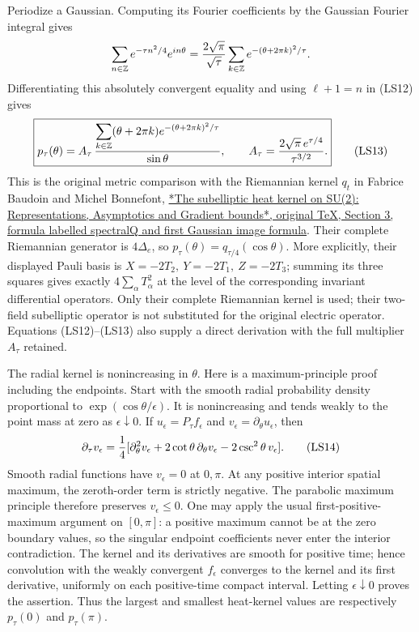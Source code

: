 \documentclass[11pt]{article}
\begin{document}
Periodize a Gaussian. Computing its Fourier coefficients by the
Gaussian Fourier integral gives
\[
 \sum_{n\in\mathbb Z}e^{-\tau n^2/4}e^{in\theta}
 ={2\sqrt\pi\over\sqrt\tau}
            \sum_{k\in\mathbb Z}e^{-(\theta+2\pi k)^2/\tau}.
 \]
Differentiating this absolutely convergent equality and using
\(\ell+1=n\) in (LS12) gives
\[
 \boxed{p_\tau(\theta)=
 A_\tau\,{\displaystyle\sum_{k\in\mathbb Z}
       (\theta+2\pi k)e^{-(\theta+2\pi k)^2/\tau}
                    \over\sin\theta},\qquad
 A_\tau={2\sqrt\pi\,e^{\tau/4}\over\tau^{3/2}}.}
 \tag{LS13}
\]
This is the original metric comparison with the Riemannian
kernel \(q_t\) in Fabrice Baudoin and Michel Bonnefont,
\href{https://arxiv.org/src/0802.3320v1}{*The subelliptic heat kernel on SU(2): Representations, Asymptotics and Gradient bounds*, original TeX, Section 3, formula labelled spectralQ and first Gaussian image formula}.
Their complete Riemannian generator is \(4\Delta_e\), so
\(p_\tau(\theta)=q_{\tau/4}(\cos\theta)\).
More explicitly, their displayed Pauli basis is
\(X=-2T_2,\ Y=-2T_1,\ Z=-2T_3\); summing its three squares
gives exactly \(4\sum_\alpha T_\alpha^2\) at the level of
the corresponding invariant differential operators.
Only their complete Riemannian kernel is used; their two-field
subelliptic operator is not substituted for the original electric
operator. Equations (LS12)–(LS13) also supply a direct derivation
with the full multiplier \(A_\tau\) retained.

The radial kernel is nonincreasing in \(\theta\). Here is a
maximum-principle proof including the endpoints. Start with the
smooth radial probability density proportional to
\(\exp(\cos\theta/\epsilon)\). It is nonincreasing and tends
weakly to the point mass at zero as \(\epsilon\downarrow0\).
If \(u_\epsilon=P_\tau f_\epsilon\) and
\(v_\epsilon=\partial_\theta u_\epsilon\), then
\[
 \partial_\tau v_\epsilon={1\over4}
 [\partial_\theta^2v_\epsilon
      +2\cot\theta\,\partial_\theta v_\epsilon
      -2\csc^2\theta\,v_\epsilon].
 \tag{LS14}
\]
Smooth radial functions have \(v_\epsilon=0\) at \(0,\pi\).
At any positive interior spatial maximum, the zeroth-order term
is strictly negative. The parabolic maximum principle therefore
preserves \(v_\epsilon\le0\). One may apply the usual first-positive-
maximum argument on \([0,\pi]\): a positive maximum cannot be at
the zero boundary values, so the singular endpoint coefficients
never enter the interior contradiction. The kernel and its
derivatives are smooth for positive time; hence convolution with
the weakly convergent \(f_\epsilon\) converges to the kernel and
its first derivative, uniformly on each positive-time compact
interval. Letting \(\epsilon\downarrow0\) proves the assertion.
Thus the largest and smallest heat-kernel values are respectively
\(p_\tau(0)\) and \(p_\tau(\pi)\).
\end{document}
